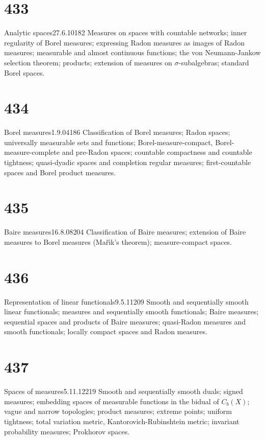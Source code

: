 \section{433}{Analytic spaces}{27.6.10}{182}{}
{Measures on spaces with countable networks;  inner regularity of Borel
measures;  expressing Radon measures as
images of Radon measures;  measurable and almost continuous functions;
the von Neumann-Jankow selection theorem;  products;  extension of
measures on $\sigma$-subalgebras;  standard Borel spaces.}

\section{434}{Borel measures}{1.9.04}{186}{}
{Classification of Borel measures;  Radon spaces;  universally
measurable sets and functions;  Borel-measure-compact,
Borel-measure-complete and pre-Radon spaces;  countable compactness and
countable tightness;
quasi-dyadic spaces and completion regular measures;  first-countable
spaces and Borel product measures.}

\section{435}{Baire measures}{16.8.08}{204}{}
{Classification of Baire measures;  extension of Baire measures to
Borel measures (Ma\v{r}\'{\i}k's theorem);  measure-compact spaces.}

\section{436}{Representation of linear functionals}{9.5.11}{209}{}
{Smooth and sequentially smooth linear functionals;  measures and
sequentially smooth functionals;  Baire measures;  
sequential spaces and products of Baire
measures;  quasi-Radon measures
and smooth functionals;  locally compact spaces and Radon measures.}

\section{437}{Spaces of measures}{5.11.12}{219}{}
{Smooth and sequentially smooth duals;  signed measures;  embedding
spaces of measurable functions in
the bidual of $C_b(X)$;  vague and narrow topologies;  product measures;
extreme points;  uniform tightness;  total variation metric,
Kantorovich-Rubinshtein metric;  invariant probability measures;
Prokhorov spaces.}

